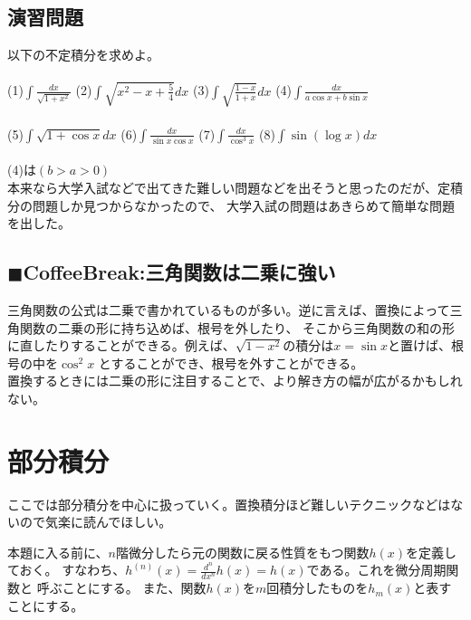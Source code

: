 \documentclass[a4j,dvipdfmx]{jsarticle}
\begin{document}
\subsection{演習問題}
以下の不定積分を求めよ。\\\\
(1)$\displaystyle\int \frac{dx}{\sqrt{1+x^2}}$
\hspace{10mm}
(2)$\displaystyle\int \sqrt{x^2-x+\frac{5}{4}}dx$
\hspace{10mm}
(3)$\displaystyle\int \sqrt{\frac{1-x}{1+x}}dx$
\hspace{10mm}
(4)$\displaystyle\int \frac{dx}{a\cos x+b\sin x}$
\\\\
(5)$\displaystyle\int \sqrt{1+\cos x}dx$
\hspace{3mm}
(6)$\displaystyle\int \frac{dx}{\sin x\cos x}$
\hspace{19mm}
(7)$\displaystyle\int \frac{dx}{\cos^3 x}$
\hspace{17mm}
(8)$\displaystyle\int\sin(\log x)dx$
\\\\
(4)は$(b>a>0)$
\\
本来なら大学入試などで出てきた難しい問題などを出そうと思ったのだが、定積分の問題しか見つからなかったので、
大学入試の問題はあきらめて簡単な問題を出した。

\subsection{$\blacksquare$CoffeeBreak:三角関数は二乗に強い}
\begin{screen}
    三角関数の公式は二乗で書かれているものが多い。逆に言えば、置換によって三角関数の二乗の形に持ち込めば、根号を外したり、
    そこから三角関数の和の形に直したりすることができる。例えば、$\sqrt{1-x^2}$の積分は$x=\sin x$と置けば、根号の中を$\cos^2 x$
    とすることができ、根号を外すことができる。\\
    置換するときには二乗の形に注目することで、より解き方の幅が広がるかもしれない。
\end{screen}
\newpage
\section{部分積分}
ここでは部分積分を中心に扱っていく。置換積分ほど難しいテクニックなどはないので気楽に読んでほしい。

本題に入る前に、$n$階微分したら元の関数に戻る性質をもつ関数$h(x)$を定義しておく。
すなわち、$\displaystyle h^{(n)}(x)=\frac{d^n}{dx^n}h(x)=h(x)$である。これを微分周期関数と
呼ぶことにする。
また、関数$h(x)$を$m$回積分したものを$h_m(x)$と表すことにする。
\end{document}
